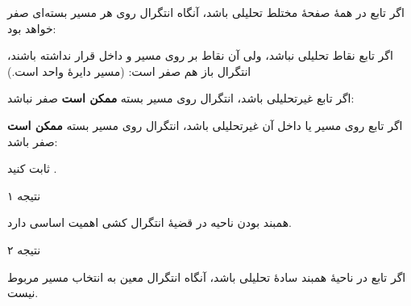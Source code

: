 \begin{EMexample}{}

اگر تابع در همهٔ صفحهٔ مختلط تحلیلی باشد، آنگاه انتگرال روی هر مسیر بسته‌ای صفر خواهد بود:

\end{EMexample}

\begin{EMexample}{}

اگر تابع نقاط تحلیلی نباشد، ولی آن نقاط بر روی مسیر و داخل  قرار نداشته باشند، انتگرال باز هم صفر است:
(مسیر دایرهٔ واحد است.)

\end{EMexample}

\begin{EMexample}{}

اگر تابع غیرتحلیلی باشد، انتگرال روی مسیر بسته \textbf{ممکن است} صفر نباشد:

\end{EMexample}

\begin{EMexample}{}

اگر تابع روی مسیر یا داخل آن غیرتحلیلی باشد، انتگرال روی مسیر بسته \textbf{ممکن است} صفر باشد:

\end{EMexample}

\begin{EMexercise}{}

ثابت کنید .

\end{EMexercise}

\begin{EMremark}{نتیجه ۱}

همبند بودن ناحیه در قضیهٔ انتگرال کشی اهمیت اساسی دارد.

\end{EMremark}

\begin{EMremark}{نتیجه ۲}

اگر تابع  در ناحیهٔ همبند سادهٔ  تحلیلی باشد، آنگاه انتگرال معین به انتخاب مسیر مربوط نیست.

\end{EMremark}

